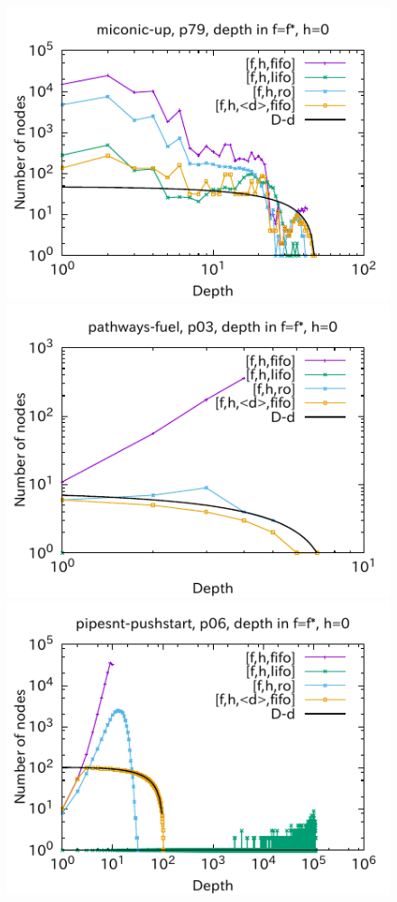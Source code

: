 \begin{figure}[htbp]
\includegraphics{img/output-lmcut/miconic-up/p79-0.pdf}
\includegraphics{img/output-lmcut/pathways-fuel/p03-0.pdf}
\includegraphics{img/output-lmcut/pipesnt-pushstart/p06-0.pdf}

\end{figure}
